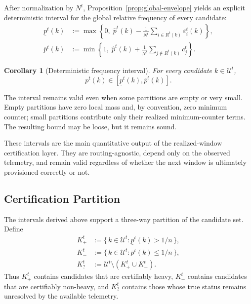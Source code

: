 \documentclass[sigconf, nonacm]{acmart}
\newtheorem{corollary}{Corollary}
\begin{document}
After normalization by \(N^t\), Proposition~\ref{prop:global-envelope} yields an explicit deterministic interval for the global relative frequency of every candidate:
\begin{align}
\underline p^t(k)
&:=
\max\!\left\{
0,\;
\hat p^t(k)
-
\frac{1}{N^t}
\sum_{i \in R^t(k)} \varepsilon_i^t(k)
\right\},
\label{eq:lower-envelope}
\\[0.75ex]
\overline p^t(k)
&:=
\min\!\left\{
1,\;
\hat p^t(k)
+
\frac{1}{N^t}
\sum_{j \notin R^t(k)} c_j^t
\right\}.
\label{eq:upper-envelope}
\end{align}

\begin{corollary}[Deterministic frequency interval]
\label{cor:freq-interval}
For every candidate \(k \in \mathcal U^t\),
\[
p^t(k) \in [\underline p^t(k), \overline p^t(k)].
\]
\end{corollary}

The interval remains valid even when some partitions are empty or very small. Empty partitions have zero local mass and, by convention, zero minimum counter; small partitions contribute only their realized minimum-counter terms. The resulting bound may be loose, but it remains sound.

These intervals are the main quantitative output of the realized-window certification layer. They are routing-agnostic, depend only on the observed telemetry, and remain valid regardless of whether the next window is ultimately provisioned correctly or not.

\subsection{Certification Partition}
\label{subsec:cert-partition}

The intervals derived above support a three-way partition of the candidate set. Define
\begin{align}
K_+^t
&:=
\{\, k \in \mathcal U^t : \underline p^t(k) > 1/n \,\},
\label{eq:kplus}
\\[0.75ex]
K_-^t
&:=
\{\, k \in \mathcal U^t : \overline p^t(k) \le 1/n \,\},
\label{eq:kminus}
\\[0.75ex]
K_?^t
&:=
\mathcal U^t \setminus (K_+^t \cup K_-^t).
\label{eq:kamb}
\end{align}
Thus \(K_+^t\) contains candidates that are certifiably heavy, \(K_-^t\) contains candidates that are certifiably non-heavy, and \(K_?^t\) contains those whose true status remains unresolved by the available telemetry.
\end{document}
